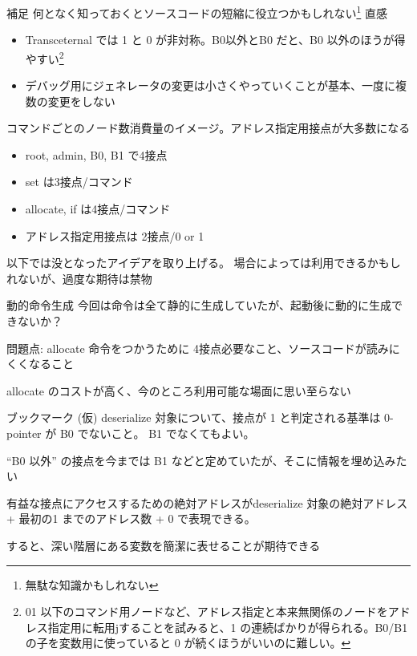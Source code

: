 \documentclass[12pt,unicode]{beamer}
\begin{document}
\begin{frame}[fragile]{補足}
   何となく知っておくとソースコードの短縮に役立つかもしれない\footnote{無駄な知識かもしれない} 直感
   \begin{itemize}
      \item Transceternal では 1 と 0 が非対称。B0以外とB0 だと、B0 以外のほうが得やすい\footnote{01 以下のコマンド用ノードなど、アドレス指定と本来無関係のノードをアドレス指定用に転用jすることを試みると、1 の連続ばかりが得られる。B0/B1 の子を変数用に使っていると 0 が続くほうがいいのに難しい。}
      \item デバッグ用にジェネレータの変更は小さくやっていくことが基本、一度に複数の変更をしない
   \end{itemize}

   コマンドごとのノード数消費量のイメージ。アドレス指定用接点が大多数になる
   \begin{itemize}
      \item root, admin, B0, B1 で4接点
      \item set は3接点/コマンド
      \item allocate, if は4接点/コマンド
      \item アドレス指定用接点は 2接点/0 or 1
   \end{itemize}
\end{frame}

\begin{frame}
   以下では没となったアイデアを取り上げる。
   場合によっては利用できるかもしれないが、過度な期待は禁物
\end{frame}

\begin{frame}{動的命令生成}
   今回は命令は全て静的に生成していたが、起動後に動的に生成できないか？

   問題点: allocate 命令をつかうために 4接点必要なこと、ソースコードが読みにくくなること

   allocate のコストが高く、今のところ利用可能な場面に思い至らない
\end{frame}

\begin{frame}{ブックマーク (仮)}
   deserialize 対象について、接点が 1 と判定される基準は 0-pointer が B0 でないこと。
   B1 でなくてもよい。

   ``B0 以外'' の接点を今までは B1 などと定めていたが、そこに情報を埋め込みたい

   有益な接点にアクセスするための絶対アドレスがdeserialize 対象の絶対アドレス + 最初の1 までのアドレス数 + 0 で表現できる。

   すると、深い階層にある変数を簡潔に表せることが期待できる
\end{frame}
\end{document}
